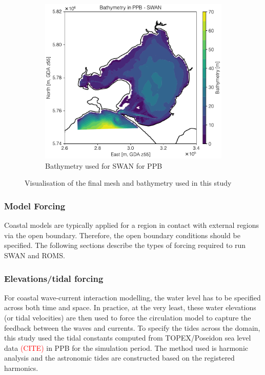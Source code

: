 \documentclass[12pt]{article}
\newcommand{\tocite}{\textcolor{red}{(CITE) }}
\begin{document}
\begin{figure}[h]
\begin{subfigure}{.5\textwidth}
  \includegraphics[scale=0.55]{plots/maps/bathymetry_SWAN.pdf}
  \caption{Bathymetry used for SWAN for PPB}
  \label{fig:bathy_PPB}
\end{subfigure}
\caption{Visualisation of the final mesh and bathymetry used in this study}
\label{fig:grid_bathy_PPB}
\end{figure}

\subsubsection {Model Forcing}

Coastal models are typically applied for a region in contact with external regions via the open boundary. Therefore, the open boundary conditions should be specified. The following sections describe the types of forcing required to run SWAN and ROMS.

\subsubsection*{Elevations/tidal forcing}

For coastal wave-current interaction modelling, the water level has to be specified across both time and space. In practice, at the very least, these water elevations (or tidal velocities) are then used to force the circulation model to capture the feedback between the waves and currents. To specify the tides across the domain, this study used the tidal constants computed from TOPEX/Poseidon sea level data \tocite in PPB for the simulation period. The method used is harmonic analysis and the astronomic tides are constructed based on the registered harmonics.  
\end{document}

